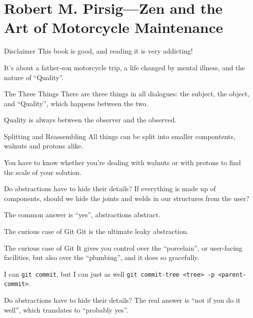\documentclass[aspectratio=169]{beamer}
\begin{document}
  \section{Robert M. Pirsig—Zen and the Art of Motorcycle Maintenance}
  \begin{frame}{Disclaimer}
    This book is good, and reading it is very addicting!

    It’s about a father-son motorcycle trip, a life changed by mental illness,
    and the nature of “Quality”.
  \end{frame}
  \begin{frame}{The Three Things}
    There are three things in all dialogues: the subject, the object, and
    “Quality”, which happens between the two.

    Quality is always between the observer and the observed.
  \end{frame}
  \begin{frame}{Splitting and Reassembling}
    All things can be split into smaller compontents, walnuts and protons alike.

    You have to know whether you’re dealing with walnuts or with protons to find
    the scale of your solution.
  \end{frame}
  \begin{frame}{Do abstractions have to hide their details?}
    If everything is made up of components, should we hide the joints and welds
    in our structures from the user?

    The common answer is “yes”, abstractions abstract.
  \end{frame}
  \begin{frame}{The curious case of Git}
    Git is the ultimate leaky abstraction.
  \end{frame}
  \begin{frame}{The curious case of Git}
    It gives you control over the “porcelain”, or user-facing facilities, but
    also over the “plumbing”, and it does so gracefully.

    I can \texttt{git commit}, but I can just as well \texttt{git commit-tree
    <tree> -p <parent-commit>}.
  \end{frame}
  \begin{frame}{Do abstractions have to hide their details?}
    The real answer is “not if you do it well”, which translates to “probably
    yes”.
  \end{frame}
\end{document}
